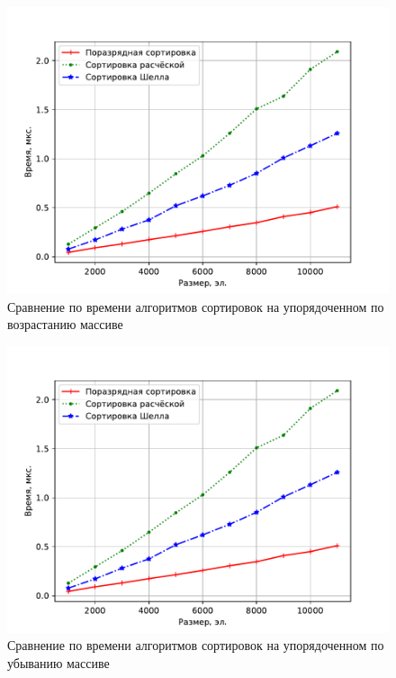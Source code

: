 \begin{figure}[H]
	\centering
	\includegraphics[height=0.4\textheight, page=1]{img/figures.pdf}
	\caption{Сравнение по времени алгоритмов сортировок на упорядоченном по возрастанию массиве}
	\label{plt:time_01}
\end{figure}


\begin{figure}[H]
	\centering
	\includegraphics[height=0.4\textheight, page=2]{img/figures.pdf}
	\caption{Сравнение по времени алгоритмов сортировок на упорядоченном по убыванию массиве}
	\label{plt:time_02}
\end{figure}

\clearpage


